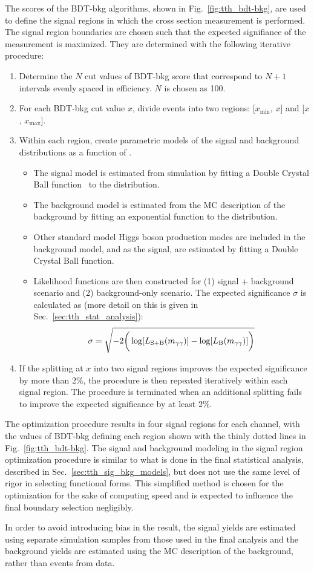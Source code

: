 The scores of the BDT-bkg algorithms, shown in Fig.~\ref{fig:tth_bdt-bkg}, are used to define the signal regions in which the \ttH cross section measurement is performed.
The signal region boundaries are chosen such that the expected signifiance of the measurement is maximized.
They are determined with the following iterative procedure:
\begin{enumerate}
    \item Determine the $N$ cut values of BDT-bkg score that correspond to $N+1$ intervals evenly spaced in \ttH efficiency. $N$ is chosen as 100.
    \item For each BDT-bkg cut value $x$, divide events into two regions: [$x_{\text{min}}$, $x$] and [$x$, $x_{\text{max}}$].
    \item Within each region, create parametric models of the signal and background distributions as a function of \mgg.
    \begin{itemize}
        \item The \ttH signal model is estimated from simulation by fitting a Double Crystal Ball function~\cite{CrystalBallRef} to the \mgg distribution.
        \item The background model is estimated from the MC description of the background by fitting an exponential function to the \mgg distribution.
        \item Other standard model Higgs boson production modes are included in the background model, and as the signal, are estimated by fitting a Double Crystal Ball function.
        \item Likelihood functions are then constructed for (1) signal + background scenario and (2) background-only scenario. The expected significance $\sigma$ is calculated as (more detail on this is given in Sec.~\ref{sec:tth_stat_analysis}):
        \begin{equation} \label{eqn:tth_significance}
            \sigma = \sqrt{-2 \bigg(\log[L_{\text{S+B}}(m_{\gamma\gamma})] - \log[L_{\text{B}}(m_{\gamma\gamma})] \bigg)}
        \end{equation} 
    \end{itemize}
    \item If the splitting at $x$ into two signal regions improves the expected significance by more than 2\%, the procedure is then repeated iteratively within each signal region. The procedure is terminated when an additional splitting fails to improve the expected significance by at least 2\%. 
\end{enumerate}
The optimization procedure results in four signal regions for each channel, with the values of BDT-bkg defining each region shown with the thinly dotted lines in Fig.~\ref{fig:tth_bdt-bkg}.
The signal and background modeling in the signal region optimization procedure is similar to what is done in the final statistical analysis, described in Sec.~\ref{sec:tth_sig_bkg_models}, but does not use the same level of rigor in selecting functional forms.
This simplified method is chosen for the optimization for the sake of computing speed and is expected to influence the final boundary selection negligibly.

In order to avoid introducing bias in the result, the \ttH signal yields are estimated using separate simulation samples from those used in the final analysis and the background yields are estimated using the MC description of the background, rather than events from data.
